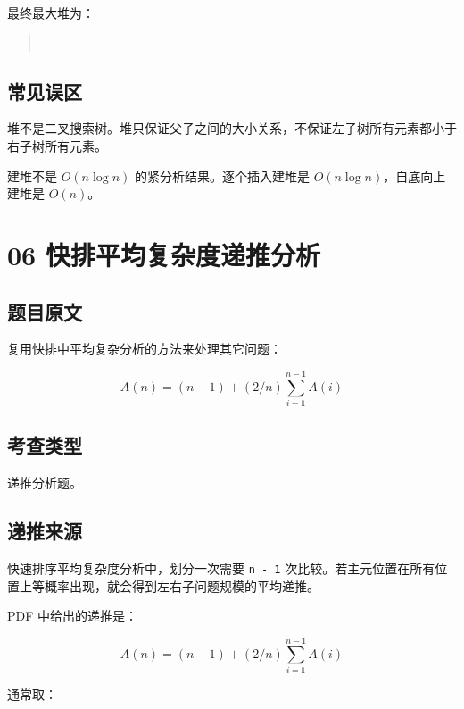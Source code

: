 \documentclass[UTF8,zihao=-4]{ctexart}
\begin{document}
最终最大堆为：

\begin{quote}
\small\ttfamily\raggedright
\relax [14,\ 8,\ 10,\ 4,\ 7,\ 9,\ 3,\ 2,\ 1]\\
\end{quote}

\subsection*{常见误区}

堆不是二叉搜索树。堆只保证父子之间的大小关系，不保证左子树所有元素都小于右子树所有元素。

建堆不是 $O(n \log n)$ 的紧分析结果。逐个插入建堆是 $O(n \log n)$，自底向上建堆是 $O(n)$。

\newpage

\section*{06 快排平均复杂度递推分析}

\subsection*{题目原文}

复用快排中平均复杂分析的方法来处理其它问题：

\[A(n) = (n - 1) + (2/n) \sum_{i=1}^{n-1} A(i)\]

\subsection*{考查类型}

递推分析题。

\subsection*{递推来源}

快速排序平均复杂度分析中，划分一次需要 \texttt{n - 1} 次比较。若主元位置在所有位置上等概率出现，就会得到左右子问题规模的平均递推。

PDF 中给出的递推是：

\[A(n) = (n - 1) + (2/n) \sum_{i=1}^{n-1} A(i)\]

通常取：
\end{document}
